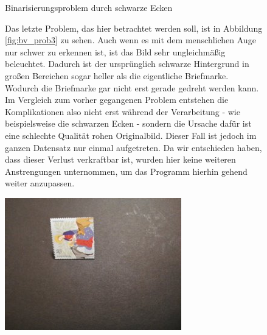 \documentclass[12pt,toc=bib,toc=listof]{scrreprt}
\begin{document}
\begin{figure}[h]
\begin{minipage}[t]{.2\linewidth}
  \caption{Binarisierungsproblem durch schwarze Ecken}
  \label{fig:bv_prob2}
\end{minipage}
\end{figure}


\begin{figure}[h]
\begin{minipage}[t]{.75\linewidth}

Das letzte Problem, das hier betrachtet werden soll, ist in Abbildung \ref{fig:bv_prob3} zu sehen. Auch wenn es mit dem menschlichen Auge nur schwer zu erkennen ist, ist das Bild sehr ungleichmäßig beleuchtet. Dadurch ist der ursprünglich schwarze Hintergrund in großen Bereichen sogar heller als die eigentliche Briefmarke. Wodurch die Briefmarke gar nicht erst gerade gedreht werden kann. Im Vergleich zum vorher gegangenen Problem entstehen die Komplikationen also nicht erst während der Verarbeitung - wie beispielsweise die schwarzen Ecken - sondern die Ursache dafür ist eine schlechte Qualität rohen Originalbild. Dieser Fall ist jedoch im ganzen Datensatz nur einmal aufgetreten.  Da wir entschieden haben, dass dieser Verlust verkraftbar ist, wurden hier keine weiteren Anstrengungen unternommen, um das Programm hierhin gehend weiter anzupassen.
\end{minipage}
\hfill
\begin{minipage}[t]{.2\linewidth}
  \strut\vspace*{-\baselineskip}\newline\includegraphics[width=\linewidth]{./../bilder/prob3_pic}

\end{minipage}
\end{figure}
\end{document}
